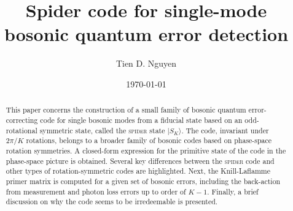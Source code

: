 \documentclass[%
 reprint,
superscriptaddress,
 amsmath,amssymb,
 aps,13pt
]{revtex4-2}
\begin{document}
\newcommand{\pos}{\text{pos}}
\newcommand{\sgn}{\text{sgn}}

\title{Spider code for single-mode bosonic quantum error detection}%

\author{Tien D. Nguyen}
%
%



\date{\today}%

\begin{abstract}
This paper concerns the construction of a small family of bosonic quantum error-correcting code for single bosonic modes from a fiducial state based on an odd-rotational symmetric state, called the \textsc{spider} state $|S_K\rangle$. The code, invariant under $2\pi/K$ rotations, belongs to a broader family of bosonic codes based on phase-space rotation symmetries. A closed-form expression for the primitive state of the code in the phase-space picture is obtained. Several key differences between the \textsc{spider} code and other types of rotation-symmetric codes are highlighted. Next, the Knill-Laflamme primer matrix is computed for a given set of bosonic errors, including the back-action from measurement and photon loss errors up to order of $K-1$. Finally, a brief discussion on why the code seems to be irredeemable is presented. 
\end{abstract}
\end{document}

